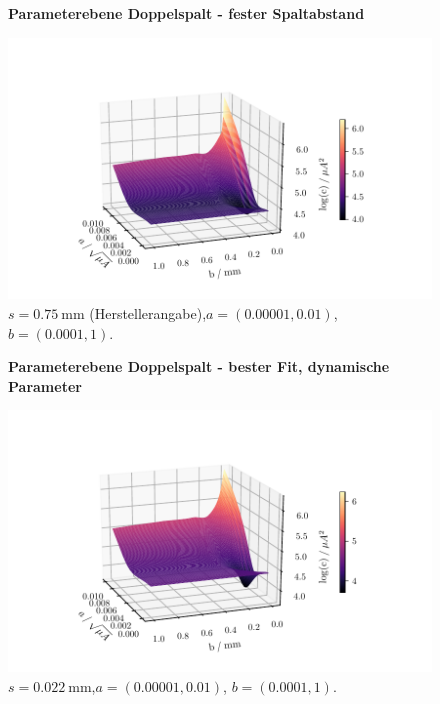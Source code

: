 \begin{figure}
    \centering
    \textbf{Parameterebene Doppelspalt - fester Spaltabstand}\par\medskip
    \includegraphics[width=.9\textwidth]{python/leastSquaresDoppel2ss.pdf}
    \caption{$s = \SI{0.75}{\milli\meter}$ (Herstellerangabe),$a = (0.00001, 0.01)$, $b = (0.0001, 1)$.}
    \label{fig:lsd2ss}
\end{figure}
\begin{figure}
    \centering
    \textbf{Parameterebene Doppelspalt - bester Fit, dynamische Parameter}\par\medskip
    \includegraphics[width=.9\textwidth]{python/leastSquaresDoppel2s.pdf}
    \caption{$s = \SI{0.022}{\milli\meter}$,$a = (0.00001, 0.01)$, $b = (0.0001, 1)$.}
    \label{fig:lsd2s}
\end{figure}

